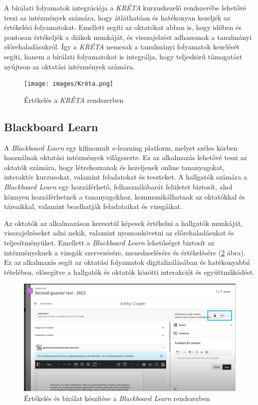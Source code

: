 A bírálati folyamatok integrációja a \textit{KRÉTA} kurzuskezelő rendszerébe lehetővé teszi az intézmények számára, hogy átláthatóan és hatékonyan kezeljék az értékelési folyamatokat. Emellett segíti az oktatókat abban is, hogy időben és pontosan értékeljék a diákok munkáját, és visszajelzést adhassanak a tanulmányi előrehaladásukról. Így a \textit{KRÉTA} nemcsak a tanulmányi folyamatok kezelését segíti, hanem a bírálati folyamatokat is integrálja, hogy teljeskörű támogatást nyújtson az oktatási intézmények számára.
\begin{figure}[h]
\centering
\texttt{[image: images/Kréta.png]}
\caption{Értékelés a \textit{KRÉTA} rendszerben \cite{kreta_jegy}}
\label{fig:kreta}
\end{figure}
\newpage
\subsection{Blackboard Learn}

A \textit{Blackboard Learn} \cite{blackboard_learn} egy kifinomult e-learning platform, melyet széles körben használnak oktatási intézmények világszerte. Ez az alkalmazás lehetővé teszi az oktatók számára, hogy létrehozzanak és kezeljenek online tananyagokat, interaktív kurzusokat, valamint feladatokat és teszteket. A hallgatók számára a \textit{Blackboard Learn} egy hozzáférhető, felhasználóbarát felületet biztosít, ahol könnyen hozzáférhetnek a tananyagokhoz, kommunikálhatnak az oktatókkal és társaikkal, valamint beadhatják feladataikat és vizsgáikat.

\overfullrule=0pt Az oktatók az alkalmazáson keresztül képesek értékelni a hallgatók munkáját, visszajelzéseket adni nekik, valamint nyomonkövetni az előrehaladásukat és teljesítményüket. Emellett a \textit{Blackboard Learn} lehetőséget biztosít az intézményeknek a vizsgák szervezésére, menedzselésére és értékelésére (\ref{fig:blackboard_learn_review} ábra). Ez az alkalmazás segít az oktatási folyamatok digitalizálásában és hatékonyabbá tételében, elősegítve a hallgatók és oktatók közötti interakciót és együttműködést.

\begin{figure}[h]
\centering
\includegraphics[scale=0.4]{images/Blackboard_Learn.png}
\caption{Értékelés és bírálat készítése a \textit{Blackboard Learn} rendszerben  \cite{blackboard_learn_review}}
\label{fig:blackboard_learn_review}
\end{figure}


